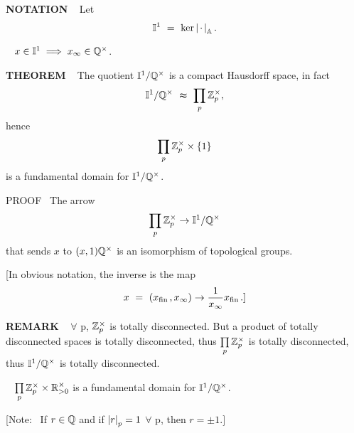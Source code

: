 \vspace{0.1cm}



\begin{x}{\small\bf NOTATION} \ %
Let
\[
\mathbb{I}^1  \ = \ \ker \left\vert\hspace{0.05cm} \cdot \hspace{0.05cm}\right\vert_{\mathbb{A}}.
\]
\end{x}

\vspace{0.1cm}


\begin{x}{\small\bf {}} \ %
$x \in \mathbb{I}^1 \implies x_\infty \in \mathbb{Q}^\times$.
\end{x}
\vspace{0.1cm}

\begin{x}{\small\bf THEOREM} \ %
The quotient $\mathbb{I}^1/\mathbb{Q}^\times$ is a compact Hausdorff space, in fact
\[
\I^1/\Q^\times \ \thickapprox \  \prod\limits_p \Z_p^\times,
\]
hence
\[
\prod\limits_p \mathbb{Z}_p^\times \times \{1\}
\]
is a fundamental domain for $\mathbb{I}^1/\mathbb{Q}^\times$.

\vspace{0.1cm}

PROOF \  
The arrow 
\[
\prod\limits_p \mathbb{Z}_p^\times \rightarrow \mathbb{I}^1/\mathbb{Q}^\times
\]
that sends $x$ to $(x,1)\mathbb{Q}^\times$ is an isomorphism of topological groups.

[In obvious notation, the inverse is the map
\[
x \ = \  (x_{\text{fin}\hspace{0.05cm}}, x_\infty) \rightarrow \frac{1}{x_\infty} x_{\text{fin}\hspace{0.05cm}}.]
\]
\end{x}
\vspace{0.1cm}

\begin{x}{\small\bf REMARK} \ %
$\forall$ p, $\mathbb{Z}_p^\times$ is totally disconnected.  
But a product of totally disconnected spaces is totally disconnected, thus $\prod\limits_p \mathbb{Z}_p^\times$ is totally disconnected, thus $\mathbb{I}^1/\mathbb{Q}^\times$ is totally disconnected.
\end{x}

\vspace{0.1cm}

\begin{x}{\small\bf \un{N.B.}} \ %
 $\prod\limits_p \mathbb{Z}_p^\times \times \mathbb{R}_{>0}^\times$ is a fundamental domain for $\mathbb{I}^1/\mathbb{Q}^\times$.

\vspace{0.1cm}

[Note: \ If $r \in \mathbb{Q}$ and if $\left\vert r\right\vert_p = 1$ $\forall$ p, then $r = \pm1.]$
\end{x}

